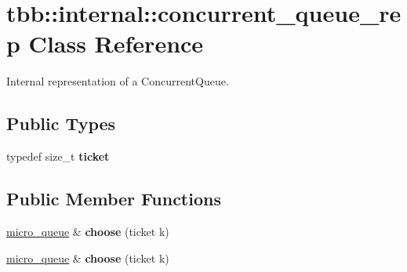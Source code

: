 \hypertarget{classtbb_1_1internal_1_1concurrent__queue__rep}{}\section{tbb\+:\+:internal\+:\+:concurrent\+\_\+queue\+\_\+rep Class Reference}
\label{classtbb_1_1internal_1_1concurrent__queue__rep}


Internal representation of a Concurrent\+Queue.  


\subsection*{Public Types}
\begin{DoxyCompactItemize}
\item 
\hypertarget{classtbb_1_1internal_1_1concurrent__queue__rep_a73f61d446bcef39f4f5bd244f542df48}{}typedef size\+\_\+t {\bfseries ticket}\label{classtbb_1_1internal_1_1concurrent__queue__rep_a73f61d446bcef39f4f5bd244f542df48}

\end{DoxyCompactItemize}
\subsection*{Public Member Functions}
\begin{DoxyCompactItemize}
\item 
\hypertarget{classtbb_1_1internal_1_1concurrent__queue__rep_a3e44c05c1d1bc311a1e71beb9f9e8e96}{}\hyperlink{structtbb_1_1internal_1_1micro__queue}{micro\+\_\+queue} \& {\bfseries choose} (ticket k)\label{classtbb_1_1internal_1_1concurrent__queue__rep_a3e44c05c1d1bc311a1e71beb9f9e8e96}

\item 
\hypertarget{classtbb_1_1internal_1_1concurrent__queue__rep_a3e44c05c1d1bc311a1e71beb9f9e8e96}{}\hyperlink{structtbb_1_1internal_1_1micro__queue}{micro\+\_\+queue} \& {\bfseries choose} (ticket k)\label{classtbb_1_1internal_1_1concurrent__queue__rep_a3e44c05c1d1bc311a1e71beb9f9e8e96}

\end{DoxyCompactItemize}
